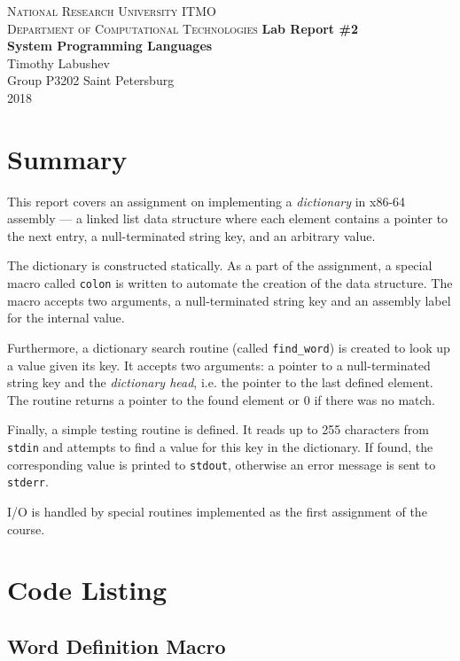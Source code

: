 \documentclass[12pt,a4paper]{report}
\begin{document}
\begin{titlepage}
\begin{center}
\textsc{
  National Research University ITMO\\[4mm]
  Department of Computational Technologies
}
\vfill
\textbf{
  Lab Report \#2\\[2mm]
  System Programming Languages
  \\[20mm]
}
Timothy Labushev\\[2mm]
Group P3202
\vfill
Saint Petersburg\\[2mm]
2018
\end{center}
\end{titlepage}

\newpage
\section*{Summary}

This report covers an assignment on implementing a \textit{dictionary} in
x86-64 assembly — a linked list data structure where each element contains
a pointer to the next entry, a null-terminated string key, and an arbitrary value.

The dictionary is constructed statically. As a part of the assignment,
a special macro called \texttt{colon} is written to automate
the creation of the data structure. The macro accepts two arguments,
a null-terminated string key and an assembly label for the internal value.

Furthermore, a dictionary search routine (called \texttt{find\_word}) is created
to look up a value given its key. It accepts two arguments: a pointer to
a null-terminated string key and the \textit{dictionary head}, i.e. the pointer
to the last defined element. The routine returns a pointer to the found element
or 0 if there was no match.

Finally, a simple testing routine is defined. It reads up to 255 characters
from \texttt{stdin} and attempts to find a value for this key in the dictionary.
If found, the corresponding value is printed to \texttt{stdout}, otherwise
an error message is sent to \texttt{stderr}.

I/O is handled by special routines implemented as the first assignment
of the course.

\section*{Code Listing}

\subsection*{Word Definition Macro}
\end{document}
